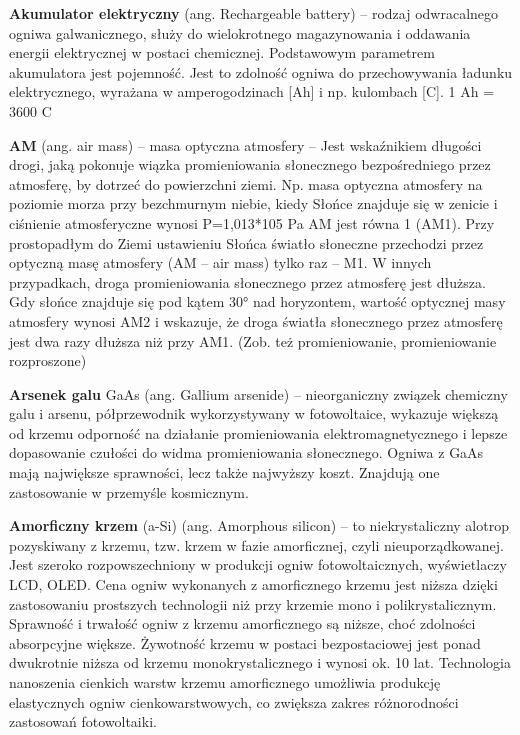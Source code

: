 \documentclass[12pt,a4paper]{article}
\begin{document}
\textbf{Akumulator elektryczny} (ang. Rechargeable battery) – rodzaj odwracalnego ogniwa galwanicznego, służy do wielokrotnego magazynowania i oddawania energii elektrycznej w postaci chemicznej. Podstawowym parametrem akumulatora jest pojemność. Jest to zdolność ogniwa do przechowywania ładunku elektrycznego, wyrażana w amperogodzinach [Ah] i np. kulombach [C]. 1 Ah = 3600 C

\textbf{AM} (ang. air mass) – masa optyczna atmosfery – Jest wskaźnikiem długości drogi, jaką pokonuje wiązka promieniowania słonecznego bezpośredniego przez atmosferę, by dotrzeć do powierzchni ziemi. Np. masa optyczna atmosfery na poziomie morza przy bezchmurnym niebie, kiedy Słońce znajduje się w zenicie i ciśnienie atmosferyczne wynosi P=1,013*105 Pa AM jest równa 1 (AM1). Przy prostopadłym do Ziemi ustawieniu Słońca światło słoneczne przechodzi przez optyczną masę atmosfery (AM – air mass) tylko raz – M1. W innych przypadkach, droga promieniowania słonecznego przez atmosferę jest dłuższa. Gdy słońce znajduje się pod kątem 30° nad horyzontem, wartość optycznej masy atmosfery wynosi AM2 i wskazuje, że droga światła słonecznego przez atmosferę jest dwa razy dłuższa niż przy AM1. (Zob. też promieniowanie, promieniowanie rozproszone)

\textbf{Arsenek galu} GaAs (ang. Gallium arsenide) – nieorganiczny związek chemiczny galu i arsenu, półprzewodnik wykorzystywany w fotowoltaice, wykazuje większą od krzemu odporność na działanie promieniowania elektromagnetycznego i lepsze dopasowanie czułości do widma promieniowania słonecznego. Ogniwa z GaAs mają największe sprawności, lecz także najwyższy koszt. Znajdują one zastosowanie w przemyśle kosmicznym.

\textbf{Amorficzny krzem} (a-Si) (ang. Amorphous silicon) – to niekrystaliczny alotrop pozyskiwany z krzemu, tzw. krzem w fazie amorficznej, czyli nieuporządkowanej. Jest szeroko rozpowszechniony w produkcji ogniw fotowoltaicznych, wyświetlaczy LCD, OLED. Cena ogniw wykonanych z amorficznego krzemu jest niższa dzięki zastosowaniu prostszych technologii niż przy krzemie mono i polikrystalicznym. Sprawność i trwałość ogniw z krzemu amorficznego są niższe, choć zdolności absorpcyjne większe. Żywotność krzemu w postaci bezpostaciowej jest ponad dwukrotnie niższa od krzemu monokrystalicznego i wynosi ok. 10 lat. Technologia nanoszenia cienkich warstw krzemu amorficznego umożliwia produkcję elastycznych ogniw cienkowarstwowych, co zwiększa zakres różnorodności zastosowań fotowoltaiki.
\end{document}
